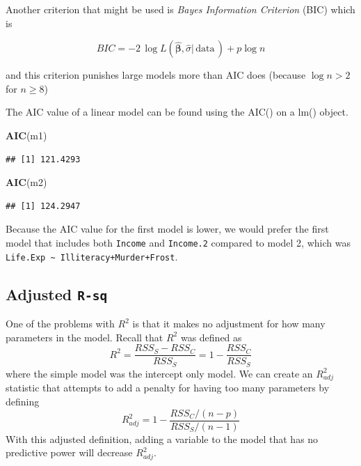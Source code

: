 \documentclass[]{book}
\newenvironment{Shaded}{\begin{snugshade}}{\end{snugshade}}
\newcommand{\KeywordTok}[1]{\textcolor[rgb]{0.13,0.29,0.53}{\textbf{{#1}}}}
\newcommand{\NormalTok}[1]{{#1}}
\theoremstyle{definition}
\theoremstyle{definition}
\theoremstyle{remark}
\begin{document}
Another criterion that might be used is \emph{Bayes Information
Criterion} (BIC) which is

\[BIC=-2\,\log L\left(\hat{\boldsymbol{\beta}},\hat{\sigma}|\,\textrm{data}\,\right)+p\log n\]

and this criterion punishes large models more than AIC does (because
\(\log n>2\) for \(n\ge8\))

The AIC value of a linear model can be found using the AIC() on a lm()
object.

\begin{Shaded}
\begin{Highlighting}[]
\KeywordTok{AIC}\NormalTok{(m1)}
\end{Highlighting}
\end{Shaded}

\begin{verbatim}
## [1] 121.4293
\end{verbatim}

\begin{Shaded}
\begin{Highlighting}[]
\KeywordTok{AIC}\NormalTok{(m2)}
\end{Highlighting}
\end{Shaded}

\begin{verbatim}
## [1] 124.2947
\end{verbatim}

Because the AIC value for the first model is lower, we would prefer the
first model that includes both \texttt{Income} and \texttt{Income.2}
compared to model 2, which was
\texttt{Life.Exp\ \textasciitilde{}\ Illiteracy+Murder+Frost}.

\subsection{\texorpdfstring{Adjusted
\texttt{R-sq}}{Adjusted R-sq}}\label{adjusted-r-sq}

One of the problems with \(R^{2}\) is that it makes no adjustment for
how many parameters in the model. Recall that \(R^{2}\) was defined as
\[R^{2}=\frac{RSS_{S}-RSS_{C}}{RSS_{S}}=1-\frac{RSS_{C}}{RSS_{S}}\]
where the simple model was the intercept only model. We can create an
\(R_{adj}^{2}\) statistic that attempts to add a penalty for having too
many parameters by defining
\[R_{adj}^{2}=1-\frac{RSS_{C}/\left(n-p\right)}{RSS_{S}/\left(n-1\right)}\]
With this adjusted definition, adding a variable to the model that has
no predictive power will decrease \(R_{adj}^{2}\).
\end{document}
